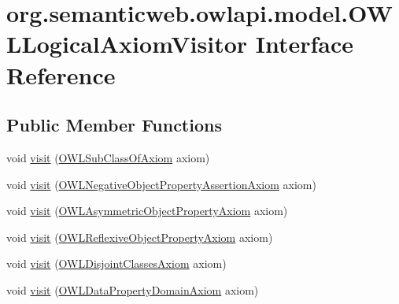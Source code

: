\hypertarget{interfaceorg_1_1semanticweb_1_1owlapi_1_1model_1_1_o_w_l_logical_axiom_visitor}{\section{org.\-semanticweb.\-owlapi.\-model.\-O\-W\-L\-Logical\-Axiom\-Visitor Interface Reference}
\label{interfaceorg_1_1semanticweb_1_1owlapi_1_1model_1_1_o_w_l_logical_axiom_visitor}
}
\subsection*{Public Member Functions}
\begin{DoxyCompactItemize}
\item 
void \hyperlink{interfaceorg_1_1semanticweb_1_1owlapi_1_1model_1_1_o_w_l_logical_axiom_visitor_a17939a84c4d78141b74886b5532f2faa}{visit} (\hyperlink{interfaceorg_1_1semanticweb_1_1owlapi_1_1model_1_1_o_w_l_sub_class_of_axiom}{O\-W\-L\-Sub\-Class\-Of\-Axiom} axiom)
\item 
void \hyperlink{interfaceorg_1_1semanticweb_1_1owlapi_1_1model_1_1_o_w_l_logical_axiom_visitor_adb0c6713b8668b02284c09a3510070f6}{visit} (\hyperlink{interfaceorg_1_1semanticweb_1_1owlapi_1_1model_1_1_o_w_l_negative_object_property_assertion_axiom}{O\-W\-L\-Negative\-Object\-Property\-Assertion\-Axiom} axiom)
\item 
void \hyperlink{interfaceorg_1_1semanticweb_1_1owlapi_1_1model_1_1_o_w_l_logical_axiom_visitor_a19a64ad3b7fb712d83ea27bfdf2d9ca5}{visit} (\hyperlink{interfaceorg_1_1semanticweb_1_1owlapi_1_1model_1_1_o_w_l_asymmetric_object_property_axiom}{O\-W\-L\-Asymmetric\-Object\-Property\-Axiom} axiom)
\item 
void \hyperlink{interfaceorg_1_1semanticweb_1_1owlapi_1_1model_1_1_o_w_l_logical_axiom_visitor_a854741884ffb7b09bf5a85121b5ab6c1}{visit} (\hyperlink{interfaceorg_1_1semanticweb_1_1owlapi_1_1model_1_1_o_w_l_reflexive_object_property_axiom}{O\-W\-L\-Reflexive\-Object\-Property\-Axiom} axiom)
\item 
void \hyperlink{interfaceorg_1_1semanticweb_1_1owlapi_1_1model_1_1_o_w_l_logical_axiom_visitor_ab9ffdd5f579d1294eb2238cc5249a358}{visit} (\hyperlink{interfaceorg_1_1semanticweb_1_1owlapi_1_1model_1_1_o_w_l_disjoint_classes_axiom}{O\-W\-L\-Disjoint\-Classes\-Axiom} axiom)
\item 
void \hyperlink{interfaceorg_1_1semanticweb_1_1owlapi_1_1model_1_1_o_w_l_logical_axiom_visitor_ab50f0bcf9b4b913de177ec21da53aa0c}{visit} (\hyperlink{interfaceorg_1_1semanticweb_1_1owlapi_1_1model_1_1_o_w_l_data_property_domain_axiom}{O\-W\-L\-Data\-Property\-Domain\-Axiom} axiom)

\end{DoxyCompactItemize}
